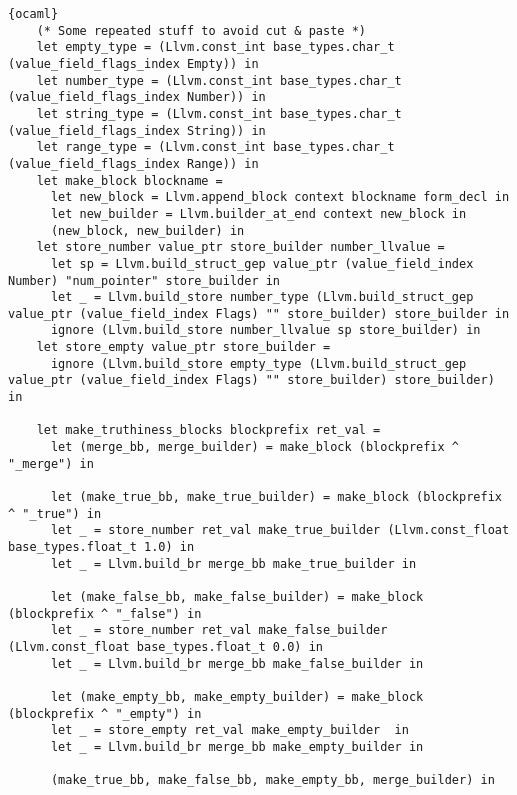 \begin{lstlisting}{ocaml}
    (* Some repeated stuff to avoid cut & paste *)
    let empty_type = (Llvm.const_int base_types.char_t (value_field_flags_index Empty)) in
    let number_type = (Llvm.const_int base_types.char_t (value_field_flags_index Number)) in
    let string_type = (Llvm.const_int base_types.char_t (value_field_flags_index String)) in
    let range_type = (Llvm.const_int base_types.char_t (value_field_flags_index Range)) in
    let make_block blockname =
      let new_block = Llvm.append_block context blockname form_decl in
      let new_builder = Llvm.builder_at_end context new_block in
      (new_block, new_builder) in
    let store_number value_ptr store_builder number_llvalue =
      let sp = Llvm.build_struct_gep value_ptr (value_field_index Number) "num_pointer" store_builder in
      let _ = Llvm.build_store number_type (Llvm.build_struct_gep value_ptr (value_field_index Flags) "" store_builder) store_builder in
      ignore (Llvm.build_store number_llvalue sp store_builder) in
    let store_empty value_ptr store_builder =
      ignore (Llvm.build_store empty_type (Llvm.build_struct_gep value_ptr (value_field_index Flags) "" store_builder) store_builder) in

    let make_truthiness_blocks blockprefix ret_val =
      let (merge_bb, merge_builder) = make_block (blockprefix ^ "_merge") in

      let (make_true_bb, make_true_builder) = make_block (blockprefix ^ "_true") in
      let _ = store_number ret_val make_true_builder (Llvm.const_float base_types.float_t 1.0) in
      let _ = Llvm.build_br merge_bb make_true_builder in

      let (make_false_bb, make_false_builder) = make_block (blockprefix ^ "_false") in
      let _ = store_number ret_val make_false_builder (Llvm.const_float base_types.float_t 0.0) in
      let _ = Llvm.build_br merge_bb make_false_builder in

      let (make_empty_bb, make_empty_builder) = make_block (blockprefix ^ "_empty") in
      let _ = store_empty ret_val make_empty_builder  in
      let _ = Llvm.build_br merge_bb make_empty_builder in

      (make_true_bb, make_false_bb, make_empty_bb, merge_builder) in


\end{lstlisting}

